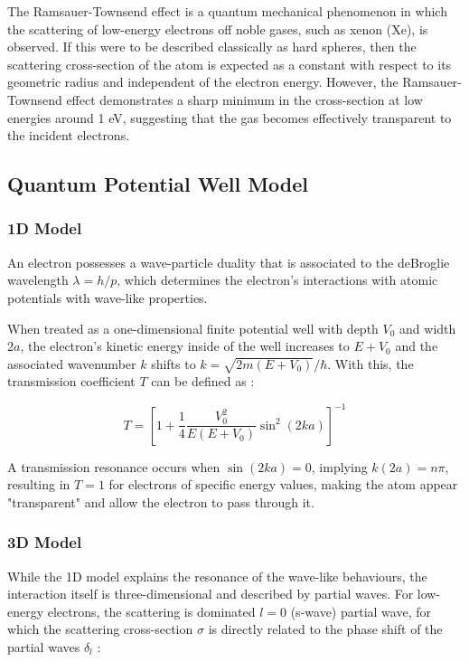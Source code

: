\documentclass[11pt, a4paper, twocolumn]{article}
\begin{document}
The Ramsauer-Townsend effect is a quantum mechanical phenomenon in which the scattering of low-energy electrons off noble gases, such as xenon (Xe), is observed. If this were to be described classically as hard spheres, then the scattering cross-section of the atom is expected as a constant with respect to its geometric radius and independent of the electron energy. However, the Ramsauer-Townsend effect demonstrates a sharp minimum in the cross-section at low energies around 1 eV, suggesting that the gas becomes effectively transparent to the incident electrons. \cite{kukolich1968demonstration,zwiebach2016lecture17}

\subsection{Quantum Potential Well Model}

\subsubsection{1D Model}

An electron possesses a wave-particle duality that is associated to the deBroglie wavelength $\lambda = h/p$, which determines the electron's interactions with atomic potentials with wave-like properties. \cite{young1996university}

When treated as a one-dimensional finite potential well with depth $V_0$ and width $2a$, the electron's kinetic energy inside of the well increases to $E + V_0$ and the associated wavenumber $k$ shifts to $k = \sqrt{2m(E+V_0)}/\hbar$. With this, the transmission coefficient $T$ can be defined as \cite{zwiebach2016lecture17,young1996university}:

\begin{equation*}
  T = \left[ 1 + \frac{1}{4}\frac{V_0^2}{E(E+V_0)} \sin^2{(2ka)} \right]^{-1}
\end{equation*}

A transmission resonance occurs when $\sin(2ka)=0$, implying $k(2a) = n\pi$, resulting in $T=1$ for electrons of specific energy values, making the atom appear "transparent" and allow the electron to pass through it. \cite{zwiebach2016lecture17,kukolich1968demonstration}

\subsubsection{3D Model}

While the 1D model explains the resonance of the wave-like behaviours, the interaction itself is three-dimensional and described by partial waves. For low-energy electrons, the scattering is dominated $l=0$ (s-wave) partial wave, for which the scattering cross-section $\sigma$ is directly related to the phase shift of the partial waves $\delta_l$ \cite{massey1956theory,o1963extrapolation,kukolich1968demonstration}:
\end{document}
